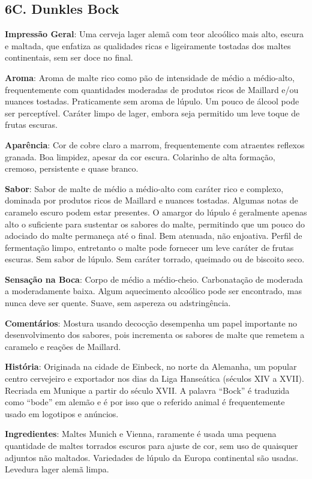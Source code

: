 \subsection*{6C. Dunkles Bock}
\textbf{Impressão Geral}: Uma cerveja lager alemã com teor alcoólico mais alto, escura e maltada, que enfatiza as qualidades ricas e ligeiramente tostadas dos maltes continentais, sem ser doce no final.

\textbf{Aroma}: Aroma de malte rico como pão de intensidade de médio a médio-alto, frequentemente com quantidades moderadas de produtos ricos de Maillard e/ou nuances tostadas. Praticamente sem aroma de lúpulo. Um pouco de álcool pode ser perceptível. Caráter limpo de lager, embora seja permitido um leve toque de frutas escuras.

\textbf{Aparência}: Cor de cobre claro a marrom, frequentemente com atraentes reflexos granada. Boa limpidez, apesar da cor escura. Colarinho de alta formação, cremoso, persistente e quase branco.

\textbf{Sabor}: Sabor de malte de médio a médio-alto com caráter rico e complexo, dominada por produtos ricos de Maillard e nuances tostadas. Algumas notas de caramelo escuro podem estar presentes. O amargor do lúpulo é geralmente apenas alto o suficiente para sustentar os sabores do malte, permitindo que um pouco do adociado do malte permaneça até o final. Bem atenuada, não enjoativa. Perfil de fermentação limpo, entretanto o malte pode fornecer um leve caráter de frutas escuras. Sem sabor de lúpulo. Sem caráter torrado, queimado ou de biscoito seco.

\textbf{Sensação na Boca}: Corpo de médio a médio-cheio. Carbonatação de moderada a moderadamente baixa. Algum aquecimento alcoólico pode ser encontrado, mas nunca deve ser quente. Suave, sem aspereza ou adstringência.

\textbf{Comentários}: Mostura usando decocção desempenha um papel importante no desenvolvimento dos sabores, pois incrementa os sabores de malte que remetem a caramelo e reações de Maillard.

\textbf{História}: Originada na cidade de Einbeck, no norte da Alemanha, um popular centro cervejeiro e exportador nos dias da Liga Hanseática (séculos XIV a XVII). Recriada em Munique a partir do século XVII. A palavra “Bock” é traduzida como “bode” em alemão e é por isso que o referido animal é frequentemente usado em logotipos e anúncios.

\textbf{Ingredientes}: Maltes Munich e Vienna, raramente é usada uma pequena quantidade de maltes torrados escuros para ajuste de cor, sem uso de quaisquer adjuntos não maltados. Variedades de lúpulo da Europa continental são usadas. Levedura lager alemã limpa.

